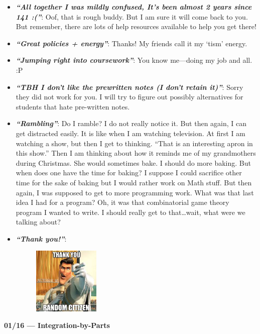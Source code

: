 \documentclass[11pt,letterpaper]{article}
\newcommand{\comment}[1]{{\itshape\bfseries ``#1''}:}
\newcommand{\pspace}{\par\vspace{\baselineskip}}
\begin{document}
\begin{itemize}
\begin{figure}[ht]
	\end{figure}
\item \comment{All together I was mildly confused, It's been almost 2 years since 141 :(} Oof, that is rough buddy. But I am sure it will come back to you. But remember, there are lots of help resources available to help you get there!
\item \comment{Great policies + energy} Thanks! My friends call it my `tism' energy. 
\item \comment{Jumping right into coursework} You know me---doing my job and all. :P
\item \comment{TBH I don't like the prewritten notes (I don't retain it)} Sorry they did not work for you. I will try to figure out possibly alternatives for students that hate pre-written notes.
\item \comment{Rambling} Do I ramble? I do not really notice it. But then again, I can get distracted easily. It is like when I am watching television. At first I am watching a show, but then I get to thinking. ``That is an interesting apron in this show.'' Then I am thinking about how it reminds me of my grandmothers during Christmas. She would sometimes bake. I should do more baking. But when does one have the time for baking? I suppose I could sacrifice other time for the sake of baking but I would rather work on Math stuff. But then again, I was supposed to get to more programming work. What was that last idea I had for a program? Oh, it was that combinatorial game theory program I wanted to write. I should really get to that\dots wait, what were we talking about?
\item \comment{Thank you!} 
	\begin{figure}[ht]
	\centering
	\includegraphics[width=0.3\textwidth]{images/thanks.jpeg}
	\end{figure}
\end{itemize} \pspace


{\bfseries\large 01/16 --- Integration-by-Parts}
\end{document}

